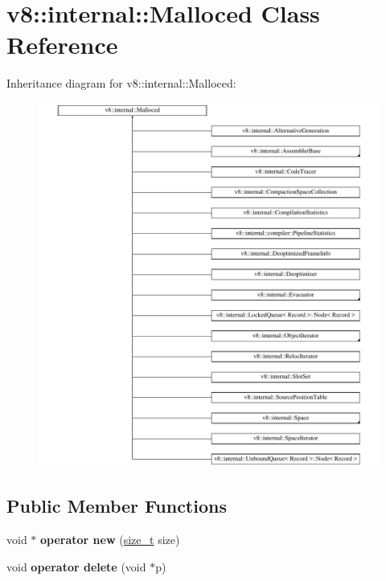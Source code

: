 \hypertarget{classv8_1_1internal_1_1Malloced}{}\section{v8\+:\+:internal\+:\+:Malloced Class Reference}
\label{classv8_1_1internal_1_1Malloced}
Inheritance diagram for v8\+:\+:internal\+:\+:Malloced\+:\begin{figure}[H]
\begin{center}
\leavevmode
\includegraphics[height=12.000000cm]{classv8_1_1internal_1_1Malloced}
\end{center}
\end{figure}
\subsection*{Public Member Functions}
\begin{DoxyCompactItemize}
\item 
\mbox{\label{classv8_1_1internal_1_1Malloced_a7dca7aef948362361f6b2e38962472e3}} 
void $\ast$ {\bfseries operator new} (\mbox{\hyperlink{classsize__t}{size\+\_\+t}} size)
\item 
\mbox{\label{classv8_1_1internal_1_1Malloced_ab53b7aaa07615d36caa3edc49bfc6019}} 
void {\bfseries operator delete} (void $\ast$p)
\end{DoxyCompactItemize}
